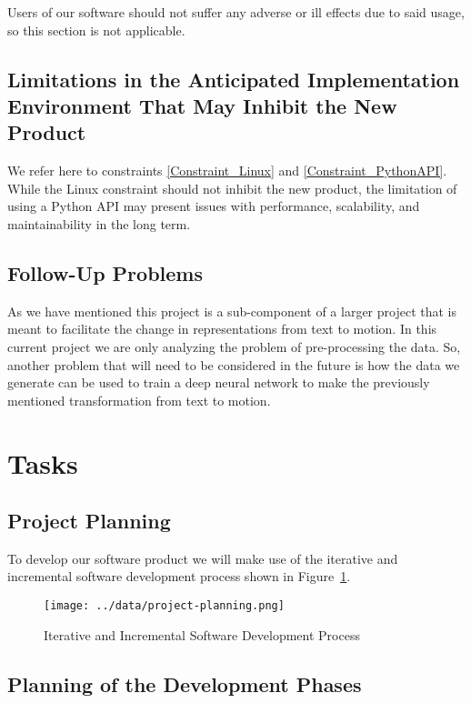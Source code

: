 \documentclass{scrreprt}
\begin{document}
Users of our software should not suffer any adverse or ill effects due to said
usage, so this section is not applicable.

\subsection{Limitations in the Anticipated Implementation Environment That May
            Inhibit the New Product}

We refer here to constraints \ref{Constraint_Linux} and \ref{Constraint_PythonAPI}.
While the Linux constraint should not inhibit the new product, the limitation
of using a Python API may present issues with performance, scalability, and
maintainability in the long term.

\subsection{Follow-Up Problems}

{As we have mentioned this project is a sub-component of a larger project that
is meant to facilitate the change in representations from text to motion. In
this current project we are only analyzing the problem of pre-processing the
data. So, another problem that will need to be considered in the future is
how the data we generate can be used to train a deep neural network to make the
previously mentioned transformation from text to motion.}

\section{Tasks}

\subsection{Project Planning}

{To develop our software product we will make use of the iterative and
incremental software development process shown in Figure~\ref{fig-project-planning}.}

{\begin{figure}[!ht]
        \label{fig-project-planning}
        \caption{Iterative and Incremental Software Development Process}
        \texttt{[image: ../data/project-planning.png]}
\end{figure}}

\subsection{Planning of the Development Phases}
\end{document}
